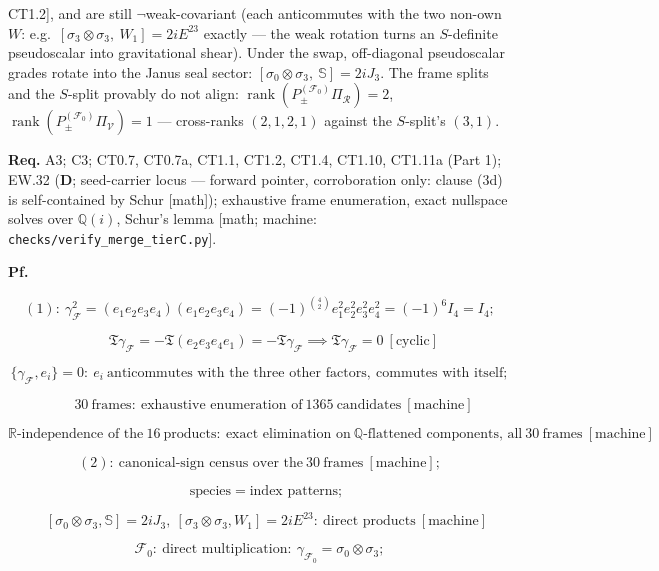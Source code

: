 \begin{theorem}
CT1.2], and are still $\neg$weak-covariant (each anticommutes with the two non-own $W$: e.g.\ $[\sigma_3\otimes\sigma_3,\ W_1]=2iE^{23}$ exactly — the weak rotation turns an $S$-definite pseudoscalar into gravitational shear). Under the swap, off-diagonal pseudoscalar grades rotate into the Janus seal sector: $[\sigma_0\otimes\sigma_3,\ \mathbb S]=2iJ_3$. The frame splits and the $S$-split provably do not align: $\operatorname{rank}(P^{(\mathcal F_0)}_\pm\Pi_{\mathcal R})=2$, $\operatorname{rank}(P^{(\mathcal F_0)}_\pm\Pi_{\mathcal V})=1$ — cross-ranks $(2,1,2,1)$ against the $S$-split's $(3,1)$.

\textbf{Req.} A3; C3; CT0.7, CT0.7a, CT1.1, CT1.2, CT1.4, CT1.10, CT1.11a (Part 1); EW.32 (\textbf{D}; seed-carrier locus — forward pointer, corroboration only: clause (3d) is self-contained by Schur [math]); exhaustive frame enumeration, exact nullspace solves over $\mathbb Q(i)$, Schur's lemma [math; machine: \texttt{checks/\allowbreak{}verify\_\allowbreak{}merge\_\allowbreak{}tierC.py}].

\textbf{Pf.}

\[
(1):\ \gamma_{\mathcal F}^2=(e_1e_2e_3e_4)(e_1e_2e_3e_4)=(-1)^{\binom42}e_1^2e_2^2e_3^2e_4^2=(-1)^6I_4=I_4;
\]

\[
\qquad \mathfrak T\gamma_{\mathcal F}=-\mathfrak T(e_2e_3e_4e_1)=-\mathfrak T\gamma_{\mathcal F}\implies\mathfrak T\gamma_{\mathcal F}=0\ [\text{cyclic}]
\]

\[
\{\gamma_{\mathcal F},e_i\}=0:\ e_i\ \text{anticommutes with the three other factors},\ \text{commutes with itself};
\]

\[
\qquad 30\ \text{frames}:\ \text{exhaustive enumeration of}\ 1365\ \text{candidates}\ [\text{machine}]
\]

\[
\mathbb R\text{-independence of the}\ 16\ \text{products}:\ \text{exact elimination on}\ \mathbb Q\text{-flattened components, all}\ 30\ \text{frames}\ [\text{machine}]
\]

\[
(2):\ \text{canonical-sign census over the}\ 30\ \text{frames}\ [\text{machine}];
\]

\[
\quad \text{species}=\text{index patterns};
\]

\[
\quad [\sigma_0\otimes\sigma_3,\mathbb S]=2iJ_3,\ [\sigma_3\otimes\sigma_3,W_1]=2iE^{23}:\ \text{direct products}\ [\text{machine}]
\]

\[
\mathcal F_0:\ \text{direct multiplication}:\ \gamma_{\mathcal F_0}=\sigma_0\otimes\sigma_3;
\]


\end{theorem}
